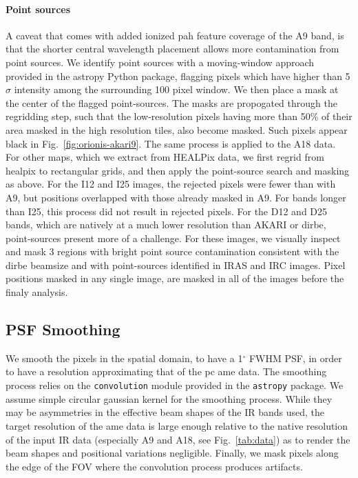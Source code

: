         \paragraph{Point sources}
          A caveat that comes with added ionized \acrshort{pah} feature coverage of the A9 band, is that the shorter central wavelength placement allows more contamination from point sources. We identify point sources with a moving-window approach provided in the astropy Python package, flagging pixels which have higher than 5$\sigma$ intensity among the surrounding 100 pixel window. We then place a mask at the center of the flagged point-sources. The masks are propogated through the regridding step, such that the low-resolution pixels having more than 50\% of their area masked in the high resolution tiles, also become masked. Such pixels appear black in Fig.~\ref{fig:orionis-akari9}. The same process is applied to the A18 data. For other maps, which we extract from HEALPix data, we first regrid from \acrshort{healpix} to rectangular grids, and then apply the point-source search and masking as above. For the I12 and I25 images, the rejected pixels were fewer than with A9, but positions overlapped with those already masked in A9. For bands longer than I25, this process did not result in rejected pixels. For the D12 and D25 bands, which are natively at a much lower resolution than AKARI or \acrshort{dirbe}, point-sources present more of a challenge. For these images, we visually inspect and mask 3 regions with bright point source contamination consistent with the \acrshort{dirbe} beamsize and with point-sources identified in IRAS and IRC images. Pixel positions masked in any single image, are masked in all of the images before the finaly analysis.


        \subsection{PSF Smoothing}
          We smooth the pixels in the spatial domain, to have a 1$^{\circ}$ FWHM PSF, in order to have a resolution approximating that of the \acrshort{pc} \acrshort{ame} data.
          The smoothing process relies on the {\tt convolution} module provided in the {\tt astropy} package. We assume simple circular gaussian kernel for the smoothing process. While they may be asymmetries in the effective beam shapes of the IR bands used, the target resolution of the \acrshort{ame} data is large enough relative to the native resolution of the input IR data (especially A9 and A18, see Fig.~\ref{tab:data}) as to render the beam shapes and positional variations negligible. Finally, we mask pixels along the edge of the FOV where the convolution process produces artifacts.

